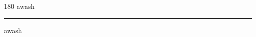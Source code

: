 
\begin{frame}
\begin{center}
\begin{turn}{180}
{\fontsize{2.5cm}{1em}\selectfont awash}
\end{turn}
\vspace{1em}\par  
\hrule
\vspace{1em}\par  
{\fontsize{2.5cm}{1em}\selectfont awash}
\end{center}
\end{frame}
